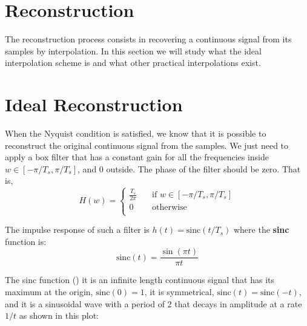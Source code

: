 \section{Reconstruction}

The reconstruction process consists in recovering a continuous signal from its samples by interpolation. In this section we will study what the ideal interpolation scheme is and what other practical interpolations exist.

\section{Ideal Reconstruction}
\label{sec:aliasing:ideal_reconstruction}

When the Nyquist condition is satisfied, we know that it is possible to reconstruct the original continuous signal from the samples. We just need to apply a box filter that has a constant gain for all the frequencies inside $w \in \left[-\pi / T_s, \pi / T_s \right]$, and 0 outside. The phase of the filter should be zero. That is,
\begin{equation}
    H(w) =
    \begin{cases}
        \frac{T_s}{2\pi} & \quad \text{if } w \in \left[-\pi / T_s, \pi / T_s \right] \\
        0                & \quad \text{otherwise }                                    \\
    \end{cases}
    \label{eq:boxfilterFT}
\end{equation}



The impulse response of such a filter is $h(t) = \text{sinc} (t/T_s)$ where the {\bf sinc} function is:
\begin{equation}
    \text{sinc} (t) = \frac{\sin (\pi t)}{\pi t}
\end{equation}

The sinc function (\fig{\ref{fig:sinc_function}}) it is an infinite length continuous signal
that has its maximum at the origin, $\text{sinc} (0)=1$, it is symmetrical, $\text{sinc} (t) = \text{sinc} (-t)$, and it is a sinusoidal wave with a period of 2 that decays in amplitude at a rate $1/t$ as shown in this plot:

